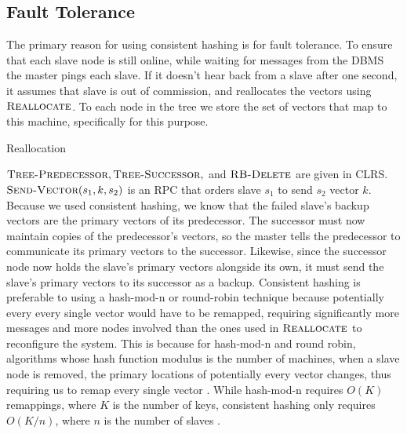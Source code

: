 \subsection{Fault Tolerance}
%
The primary reason for using consistent hashing is for fault tolerance. To ensure
that each slave node is still online, while waiting for messages from the DBMS
the master pings each slave. If it doesn't hear back from a slave after one second,
it assumes that slave is out of commission, and reallocates the vectors using
$\textsc{Reallocate}$. To each node in the tree we store the set of vectors that
map to this machine, specifically for this purpose.
\begin{algorithm}
    \begin{algorithmic}
      \EndFor
      \EndFor
    \end{algorithmic}
    \caption{Reallocation}
\end{algorithm}
$\textsc{Tree-Predecessor},\textsc{Tree-Successor},$ and $\textsc{RB-Delete}$ are given
in CLRS. $\textsc{Send-Vector}(s_1,k,s_2)$ is an RPC that orders slave $s_1$ to send
$s_2$ vector $k$. Because we used consistent hashing, we know that the failed slave's
backup vectors are the primary vectors of its predecessor. The successor must
now maintain copies of the predecessor's vectors, so the master tells the predecessor to communicate
its primary vectors to the successor.
Likewise, since the successor node now holds the slave's primary vectors alongside
its own, it must send the slave's primary vectors to its successor as a backup.
Consistent hashing is preferable to using a hash-mod-n or round-robin technique
because potentially every every single vector would have to be remapped,
requiring significantly more messages and more nodes involved than the ones
used in $\textsc{Reallocate}$ to reconfigure the system. This is because for
hash-mod-n and round robin, algorithms whose hash function modulus is
the number of machines, when a slave node is removed, the primary locations
of potentially every vector changes, thus requiring us to remap every
single vector \cite{kleppman2017}. While hash-mod-n requires $O(K)$ remappings,
where $K$ is the number of keys, consistent hashing only requires $O(K/n)$,
where $n$ is the number of slaves \cite{karger1997}.
%
